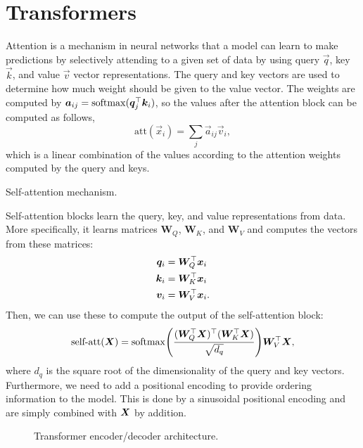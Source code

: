 \section{Transformers} \label{sec:transformers}

Attention is a mechanism in neural networks that a model can learn to make
predictions by selectively attending to a given set of data by using query
$\vec{q}$, key $\vec{k}$, and value $\vec{v}$ vector representations. The query
and key vectors are used to determine how much weight should be given to the
value vector. The weights are computed by
$\bm{a}_{ij}=\mathrm{softmax}(\bm{q}_j^\top\bm{k}_i)$, so the values after the
attention block can be computed as follows, \[
  \text{att}(\vec{x}_i) = \sum_{j} \vec{a}_{ij} \vec{v}_i
,\]
which is a linear combination of the values according to the attention weights
computed by the query and keys.

\begin{marginfigure}
    \centering
    \caption{Self-attention mechanism.}
    \label{fig:attention}
\end{marginfigure}

Self-attention blocks learn the query, key, and value representations from
data. More specifically, it learns matrices $\bm{W}_Q$, $\bm{W}_K$, and
$\bm{W}_V$ and computes the vectors from these matrices:
\begin{align*}
  \bm{q}_i &= \bm{W}_Q^\top \bm{x}_i \\
  \bm{k}_i &= \bm{W}_K^\top \bm{x}_i \\
  \bm{v}_i &= \bm{W}_V^\top \bm{x}_i
.\end{align*}
Then, we can use these to compute the output of the self-attention block: \[
  \text{self-att}(\mat{X}) = \softmax \lft( \frac{\transpose{(\transpose{\mat{W}_Q} \mat{X})}(\transpose{\mat{W}_K}\mat{X})}{\sqrt{d_q}} \rgt) \transpose{\mat{W}_V}\mat{X}
,\]
where $d_q$ is the square root of the dimensionality of the query and key
vectors. Furthermore, we need to add a positional encoding to provide ordering
information to the model. This is done by a sinusoidal positional encoding and are simply
combined with $\bm{X}$ by addition.

\begin{figure}[ht]
    \centering
    \caption{Transformer encoder/decoder architecture.}
    \label{fig:transformer}
\end{figure}

